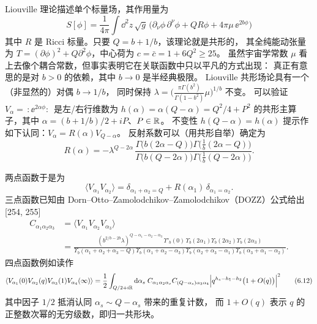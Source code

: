 Liouville 理论描述单个标量场，其作用量为
\begin{equation}
S[\phi]=\frac{1}{4\pi}\int \dd^2z\,\sqrt{g}\,
\big(\partial_\nu\phi\,\partial^\nu\phi+QR\phi+4\pi\mu\,\ee^{2b\phi}\big)
\tag{6.8}
\end{equation}
其中 $R$ 是 Ricci 标量。只要 $Q=b+1/b$，该理论就是共形的，
其全纯能动张量为 $T=(\partial\phi)^2+Q\partial^2\phi$，中心荷为 $c=\bar c=1+6Q^2\ge 25$。
虽然宇宙学常数 $\mu$ 看上去像个耦合常数，但事实表明它在关联函数中只以平凡的方式出现：
真正有意思的是对 $b>0$ 的依赖，其中 $b\to 0$ 是半经典极限。
Liouville 共形场论具有一个（非显然的）对偶 $b\to 1/b$，
同时保持 $\lambda=\big(\frac{\pi\Gamma(b^2)}{\Gamma(1-b^2)}\mu\big)^{1/b}$ 不变。
可以验证 $V_\alpha=\,:\!\ee^{2\alpha\phi}\!:\,$ 是左/右行维数为
$h(\alpha)=\alpha(Q-\alpha)=Q^2/4+P^2$ 的共形主算子，其中 $\alpha=(b+1/b)/2+iP$、$P\in\mathbb{R}$。
不变性 $h(Q-\alpha)=h(\alpha)$ 提示作如下认同：$V_\alpha=R(\alpha)V_{Q-\alpha}$。
反射系数可以（用共形自举）确定为
\begin{equation}
R(\alpha)=-\lambda^{Q-2\alpha}\,
\frac{\Gamma\big(b(2\alpha-Q)\big)\Gamma\big(\tfrac{1}{b}(2\alpha-Q)\big)}
{\Gamma\big(b(Q-2\alpha)\big)\Gamma\big(\tfrac{1}{b}(Q-2\alpha)\big)}.
\tag{6.9}
\end{equation}

两点函数于是为
\begin{equation}
\langle V_{\alpha_1}V_{\alpha_2}\rangle
=\delta_{\alpha_1+\alpha_2=Q}+R(\alpha_1)\,\delta_{\alpha_1=\alpha_2}.
\tag{6.10}
\end{equation}
三点函数已知由 Dorn--Otto--Zamolodchikov--Zamolodchikov（DOZZ）公式给出 [254, 255]
\begin{equation}
\begin{aligned}
C_{\alpha_1\alpha_2\alpha_3}
&=\langle V_{\alpha_1}V_{\alpha_2}V_{\alpha_3}\rangle\\
&=\frac{(b^{2/b-2b}\lambda)^{Q-\alpha_1-\alpha_2-\alpha_3}\,
\Upsilon'_b(0)\,\Upsilon_b(2\alpha_1)\Upsilon_b(2\alpha_2)\Upsilon_b(2\alpha_3)}
{\Upsilon_b(\alpha_1+\alpha_2+\alpha_3-Q)\Upsilon_b(\alpha_1+\alpha_2-\alpha_3)
\Upsilon_b(\alpha_2+\alpha_3-\alpha_1)\Upsilon_b(\alpha_3+\alpha_1-\alpha_2)}.
\end{aligned}
\tag{6.11}
\end{equation}
四点函数例如读作
\begin{equation}
\langle V_{\alpha_1}(0)V_{\alpha_2}(q)V_{\alpha_3}(1)V_{\alpha_4}(\infty)\rangle
=\frac{1}{2}\int_{Q/2+i\mathbb{R}}\mathrm{d}\alpha_s\;
C_{\alpha_1\alpha_2\alpha_s}C_{(Q-\alpha_s)\alpha_3\alpha_4}
\Big|q^{h_s-h_1-h_2}\big(1+O(q)\big)\Big|^2
\tag{6.12}
\end{equation}
其中因子 $1/2$ 抵消认同 $\alpha_s\sim Q-\alpha_s$ 带来的重复计数，
而 $1+O(q)$ 表示 $q$ 的正整数次幂的无穷级数，即归一共形块。

